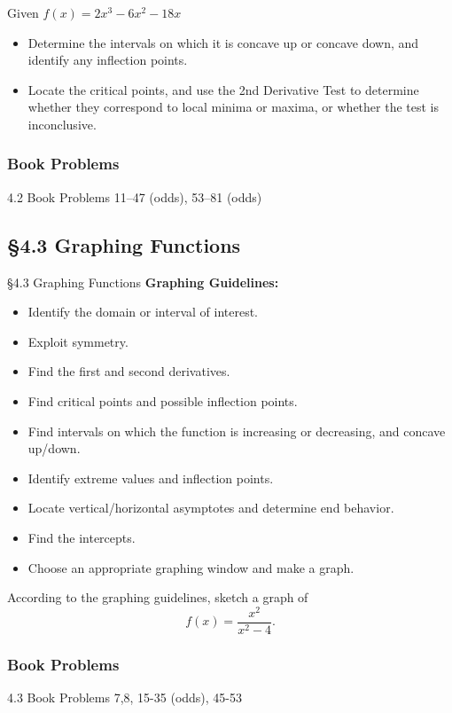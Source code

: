 \documentclass[cal1spr16Lectures.tex]{subfiles}
\begin{document}
\begin{frame}
\begin{exe}
Given $f(x)=2x^3-6x^2-18x$
\begin{itemize}
\item[(a)] Determine the intervals on which it is concave up or concave down, and identify any inflection points.
\item[(b)] Locate the critical points, and use the 2nd Derivative Test to determine whether they correspond to local minima or maxima, or whether the test is inconclusive.
\end{itemize}
\end{exe}
\end{frame}

\subsubsection{Book Problems}


\begin{frame}
\begin{block}{4.2 Book Problems}
11--47 (odds), 53--81 (odds)
\end{block}
\end{frame}

\subsection[4.3 Graphing Functions]{\S 4.3 Graphing Functions}

\begin{frame}{\S 4.3 Graphing Functions}
\footnotesize
{\bf Graphing Guidelines:}
\begin{itemize}
\item[1.] Identify the domain or interval of interest.
\item[2.] Exploit symmetry.
\item[3.] Find the first and second derivatives.
\item[4.] Find critical points and possible inflection points.
\item[5.] Find intervals on which the function is increasing or decreasing, and concave up/down.
\item[6.] Identify extreme values and inflection points.
\item[7.] Locate vertical/horizontal asymptotes and determine end behavior.
\item[8.] Find the intercepts.
\item[9.] Choose an appropriate graphing window and make a graph.
\end{itemize}
\end{frame}

\begin{frame}
\begin{exe} According to the graphing guidelines, sketch a graph of 
\[f(x)=\frac{x^2}{x^2-4}.\]
\end{exe}
\end{frame}

\subsubsection{Book Problems}

\begin{frame}
\begin{block}{4.3 Book Problems}
7,8, 15-35 (odds), 45-53 
\end{block}
\end{frame}
\end{document}
